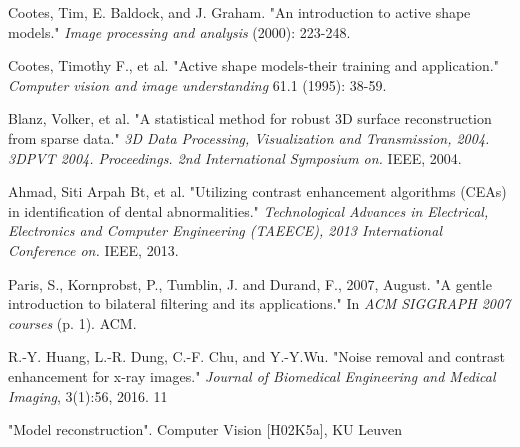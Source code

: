\documentclass[a4paper]{article}
\begin{document}
\clearpage
\begin{thebibliography}{99}
    
    Cootes, Tim, E. Baldock, and J. Graham. "An introduction to active shape models." \textit{Image processing and analysis} (2000): 223-248.
    
    Cootes, Timothy F., et al. "Active shape models-their training and application." \textit{Computer vision and image understanding} 61.1 (1995): 38-59.
    
    Blanz, Volker, et al. "A statistical method for robust 3D surface reconstruction from sparse data." \textit{3D Data Processing, Visualization and Transmission, 2004. 3DPVT 2004. Proceedings. 2nd International Symposium on.} IEEE, 2004.
    
    Ahmad, Siti Arpah Bt, et al. "Utilizing contrast enhancement algorithms (CEAs) in identification of dental abnormalities." \textit{Technological Advances in Electrical, Electronics and Computer Engineering (TAEECE), 2013 International Conference on.} IEEE, 2013.
    
    Paris, S., Kornprobst, P., Tumblin, J. and Durand, F., 2007, August. "A gentle introduction to bilateral filtering and its applications." In \textit{ACM SIGGRAPH 2007 courses} (p. 1). ACM.
    
    R.-Y. Huang, L.-R. Dung, C.-F. Chu, and Y.-Y.Wu. "Noise removal and contrast enhancement for x-ray images." \textit{Journal of Biomedical Engineering and Medical Imaging}, 3(1):56, 2016.
11
    
    "Model reconstruction". Computer Vision [H02K5a], KU Leuven 
    

\end{thebibliography}
\end{document}
